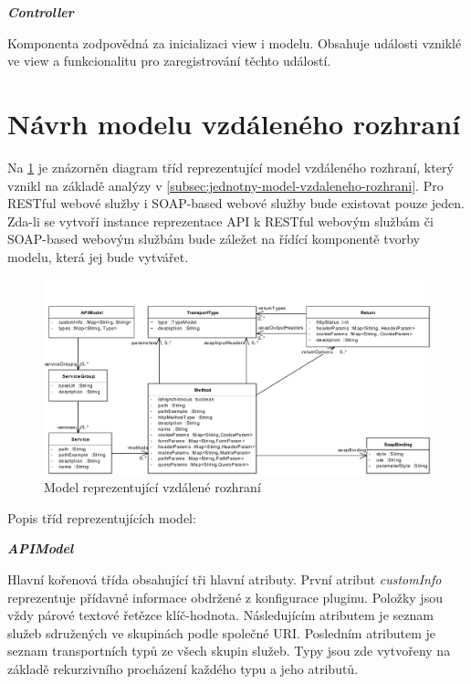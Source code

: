 \documentclass[11pt,twoside,a4paper]{book}
\begin{document}
\textbf{\textit{Controller}}

Komponenta zodpovědná za inicializaci view i modelu. Obsahuje události vzniklé ve view a
funkcionalitu pro zaregistrování těchto událostí.

\section{Návrh modelu vzdáleného rozhraní}

Na \ref{fig:navrh-modelu} je znázorněn diagram tříd reprezentující model
vzdáleného rozhraní, který vznikl na základě analýzy v
\ref{subsec:jednotny-model-vzdaleneho-rozhrani}. Pro RESTful webové služby i
SOAP-based webové služby bude existovat pouze jeden. Zda-li se vytvoří instance
reprezentace API k RESTful webovým službám či SOAP-based webovým službám bude
záležet na řídící komponentě tvorby modelu, která jej bude vytvářet.

\begin{figure}[h]
\begin{center}
\includegraphics[width=13cm]{images-pdf/UniversalModel.pdf}
\caption{Model reprezentující vzdálené rozhraní}
\label{fig:navrh-modelu}
\end{center}
\end{figure}

Popis tříd reprezentujících model:

\textbf{\textit{APIModel}}

Hlavní kořenová třída obsahující tři hlavní atributy. První atribut {\em
customInfo} reprezentuje přídavné informace obdržené z konfigurace pluginu.
Položky jsou vždy párové textové řetězce klíč-hodnota. Následujícím atributem je
seznam služeb sdružených ve skupinách podle společné URI. Posledním atributem je
seznam transportních typů ze všech skupin služeb. Typy jsou zde vytvořeny na
základě rekurzivního procházení každého typu a jeho atributů.
\end{document}

